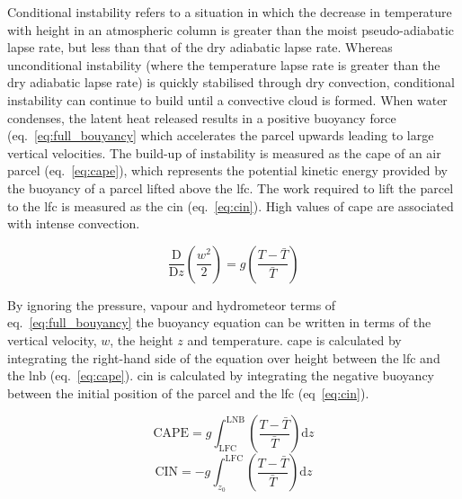 Conditional instability refers to a situation in which the decrease in temperature with height in an atmospheric column is greater than the moist pseudo-adiabatic lapse rate, but less than that of the dry adiabatic lapse rate. 
Whereas unconditional instability (where the temperature lapse rate is greater than the dry adiabatic lapse rate) is quickly stabilised through dry convection, conditional instability can continue to build until a convective cloud is formed. 
When water condenses, the latent heat released results in a positive buoyancy force (eq.~\ref{eq:full_bouyancy} which accelerates the parcel upwards leading to large vertical velocities.
The build-up of instability is measured as the \acrfull{cape} of an air parcel (eq.~\ref{eq:cape}), which represents the potential kinetic energy provided by the buoyancy of a parcel lifted above the \acrshort{lfc}. The work required to lift the parcel to the \acrshort{lfc} is measured as the \acrfull{cin} (eq.~\ref{eq:cin}). High values of \acrshort{cape} are associated with intense convection.

\begin{eqfloat}
    \begin{equation}
    \label{eq:simple_bouyancy}
        \frac{\mathrm{D} }{\mathrm{D} z} \left (\frac{w^2}{2}  \right ) = g \left ( \frac{T - \bar{T}}{\bar{T}} \right )
    \end{equation}
    \caption{By ignoring the pressure, vapour and hydrometeor terms of eq.~\ref{eq:full_bouyancy} the buoyancy equation can be written in terms of the vertical velocity, $w$, the height $z$ and temperature. \acrshort{cape} is calculated by integrating the right-hand side of the equation over height between the \acrshort{lfc} and the \acrfull{lnb} (eq.~\ref{eq:cape}). \acrshort{cin} is calculated by integrating the negative buoyancy between the initial position of the parcel and the \acrshort{lfc} (eq~\ref{eq:cin}).}
    \begin{equation}
    \label{eq:cape}
        \mathrm{CAPE} = g \int_{\mathrm{LFC}}^{\mathrm{LNB}} \left ( \frac{T - \bar{T}}{\bar{T}} \right ) \mathrm{d}z
    \end{equation}
    \begin{equation}
    \label{eq:cin}
        \mathrm{CIN} = - g \int_{z_0}^{\mathrm{LFC}} \left ( \frac{T - \bar{T}}{\bar{T}} \right ) \mathrm{d}z
    \end{equation}
\end{eqfloat}

